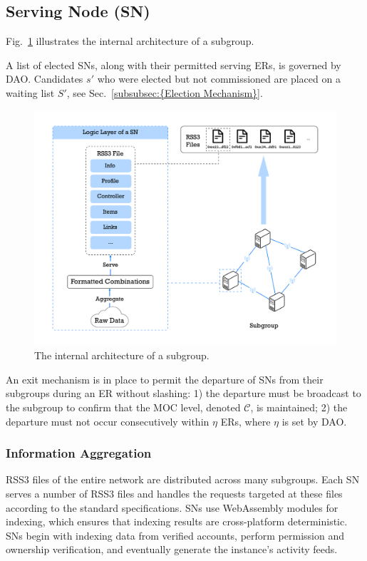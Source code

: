 \subsection{Serving Node (SN)}

Fig.~\ref{fig:sn-arch} illustrates the internal architecture of a subgroup.

A list of elected SNs, along with their permitted serving ERs, is governed by DAO. Candidates ${s'}$ who were elected but not commissioned are placed on a waiting list ${S'}$, see Sec.~\ref{subsubsec:{Election Mechanism}}. 

\begin{figure}[tb!]
    \centering
    \includegraphics[width=\columnwidth]{figures/sn-arch.jpg}
    \caption{The internal architecture of a subgroup.}
    \label{fig:sn-arch}
\end{figure}

An exit mechanism is in place to permit the departure of SNs from their subgroups during an ER without slashing: 1) the departure must be broadcast to the subgroup to confirm that the MOC level, denoted $\mathcal{C}$, is maintained; 2) the departure must not occur consecutively within $\eta$ ERs, where $\eta$ is set by DAO.

\subsubsection{Information Aggregation}

RSS3 files of the entire network are distributed across many subgroups. Each SN serves a number of RSS3 files and handles the requests targeted at these files according to the standard specifications. SNs use WebAssembly modules for indexing, which ensures that indexing results are cross-platform deterministic. SNs begin with indexing data from verified accounts, perform permission and ownership verification, and eventually generate the instance's activity feeds.


